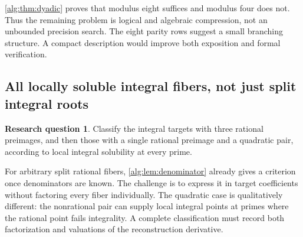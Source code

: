 \documentclass[11pt]{article}
\numberwithin{equation}{section}
\theoremstyle{plain}
\theoremstyle{plain}
\theoremstyle{plain}
\theoremstyle{definition}
\theoremstyle{definition}
\newtheorem{question}[question]{Research question}
\theoremstyle{definition}
\theoremstyle{remark}
\begin{document}
\cref{alg:thm:dyadic} proves that modulus eight suffices and modulus four
does not. Thus the remaining problem is logical and algebraic compression,
not an unbounded precision search. The eight parity rows suggest a small
branching structure. A compact description would improve both exposition
and formal verification.

\subsection{All locally soluble integral fibers, not just split integral roots}\label{alg:sub:q-split}
\begin{question}
Classify the integral targets with three rational preimages, and then
those with a single rational preimage and a quadratic pair, according to
local integral solubility at every prime.
\end{question}

For arbitrary split rational fibers, \cref{alg:lem:denominator} already gives
a criterion once denominators are known. The challenge is to express it
in target coefficients without factoring every fiber individually.
The quadratic case is qualitatively different: the nonrational pair can
supply local integral points at primes where the rational point fails
integrality. A complete classification must record both factorization
and valuations of the reconstruction derivative.
\end{document}
